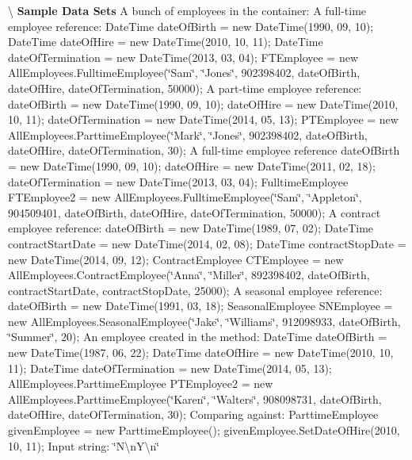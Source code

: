 \textbackslash{} {\bfseries  Sample Data Sets} A bunch of employees in the container\+: A full-\/time employee reference\+: Date\+Time date\+Of\+Birth = new Date\+Time(1990, 09, 10); Date\+Time date\+Of\+Hire = new Date\+Time(2010, 10, 11); Date\+Time date\+Of\+Termination = new Date\+Time(2013, 03, 04); F\+T\+Employee = new All\+Employees.\+Fulltime\+Employee(\char`\"{}\+Sam\char`\"{}, \char`\"{}\+Jones\char`\"{}, 902398402, date\+Of\+Birth, date\+Of\+Hire, date\+Of\+Termination, 50000); A part-\/time employee reference\+: date\+Of\+Birth = new Date\+Time(1990, 09, 10); date\+Of\+Hire = new Date\+Time(2010, 10, 11); date\+Of\+Termination = new Date\+Time(2014, 05, 13); P\+T\+Employee = new All\+Employees.\+Parttime\+Employee(\char`\"{}\+Mark\char`\"{}, \char`\"{}\+Jones\char`\"{}, 902398402, date\+Of\+Birth, date\+Of\+Hire, date\+Of\+Termination, 30); A full-\/time employee reference date\+Of\+Birth = new Date\+Time(1990, 09, 10); date\+Of\+Hire = new Date\+Time(2011, 02, 18); date\+Of\+Termination = new Date\+Time(2013, 03, 04); Fulltime\+Employee F\+T\+Employee2 = new All\+Employees.\+Fulltime\+Employee(\char`\"{}\+Sam\char`\"{}, \char`\"{}\+Appleton\char`\"{}, 904509401, date\+Of\+Birth, date\+Of\+Hire, date\+Of\+Termination, 50000); A contract employee reference\+: date\+Of\+Birth = new Date\+Time(1989, 07, 02); Date\+Time contract\+Start\+Date = new Date\+Time(2014, 02, 08); Date\+Time contract\+Stop\+Date = new Date\+Time(2014, 09, 12); Contract\+Employee C\+T\+Employee = new All\+Employees.\+Contract\+Employee(\char`\"{}\+Anna\char`\"{}, \char`\"{}\+Miller\char`\"{}, 892398402, date\+Of\+Birth, contract\+Start\+Date, contract\+Stop\+Date, 25000); A seasonal employee reference\+: date\+Of\+Birth = new Date\+Time(1991, 03, 18); Seasonal\+Employee S\+N\+Employee = new All\+Employees.\+Seasonal\+Employee(\char`\"{}\+Jake\char`\"{}, \char`\"{}\+Williams\char`\"{}, 912098933, date\+Of\+Birth, \char`\"{}\+Summer\char`\"{}, 20); An employee created in the method\+: Date\+Time date\+Of\+Birth = new Date\+Time(1987, 06, 22); Date\+Time date\+Of\+Hire = new Date\+Time(2010, 10, 11); Date\+Time date\+Of\+Termination = new Date\+Time(2014, 05, 13); All\+Employees.\+Parttime\+Employee P\+T\+Employee2 = new All\+Employees.\+Parttime\+Employee(\char`\"{}\+Karen\char`\"{}, \char`\"{}\+Walters\char`\"{}, 908098731, date\+Of\+Birth, date\+Of\+Hire, date\+Of\+Termination, 30); Comparing against\+: Parttime\+Employee given\+Employee = new Parttime\+Employee(); given\+Employee.\+Set\+Date\+Of\+Hire(2010, 10, 11); Input string\+: \char`\"{}\+N\textbackslash{}n\+Y\textbackslash{}n\char`\"{}

